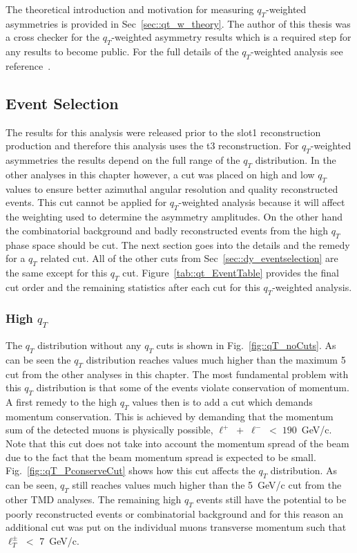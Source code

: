 The theoretical introduction and motivation for measuring $q_T$-weighted
asymmetries is provided in Sec~\ref{sec::qt_w_theory}.  The author of this
thesis was a cross checker for the $q_T$-weighted asymmetry results which is a
required step for any results to become public.  For the full details of the
$q_T$-weighted analysis see reference~\cite{janthesis}.

\subsection{Event Selection}
The results for this analysis were released prior to the slot1 reconstruction
production and therefore this analysis uses the t3 reconstruction.  For
$q_T$-weighted asymmetries the results depend on the full range of the $q_T$
distribution.  In the other analyses in this chapter however, a cut was placed
on high and low $q_T$ values to ensure better azimuthal angular resolution and
quality reconstructed events.  This cut cannot be applied for $q_T$-weighted
analysis because it will affect the weighting used to determine the asymmetry
amplitudes.  On the other hand the combinatorial background and badly
reconstructed events from the high $q_T$ phase space should be cut.  The next
section goes into the details and the remedy for a $q_T$ related cut. All of the
other cuts from Sec~\ref{sec::dy_eventselection} are the same except for this
$q_T$ cut. Figure~\ref{tab::qt_EventTable} provides the final cut order and the
remaining statistics after each cut for this $q_T$-weighted analysis.

\subsubsection{High $q_T$} \label{sec::high_qt}
The $q_T$ distribution without any $q_T$ cuts is shown in
Fig.~\ref{fig::qT_noCuts}.  As can be seen the $q_T$ distribution reaches values
much higher than the maximum 5~{\gvc} cut from the other analyses in this
chapter.  The most fundamental problem with this $q_T$ distribution is that some
of the events violate conservation of momentum.  A first remedy to the high
$q_T$ values then is to add a cut which demands momentum conservation.  This is
achieved by demanding that the momentum sum of the detected muons is physically
possible, $\ell^+ \; + \; \ell^- \; < \; 190$~GeV/c.  Note that this cut does
not take into account the momentum spread of the beam due to the fact that the
beam momentum spread is expected to be small.  Fig.~\ref{fig::qT_PconserveCut}
shows how this cut affects the $q_T$ distribution.  As can be seen, $q_T$ still
reaches values much higher than the 5~GeV/c cut from the other TMD analyses.
The remaining high $q_T$ events still have the potential to be poorly
reconstructed events or combinatorial background and for this reason an
additional cut was put on the individual muons transverse momentum such that
$\ell_T^{\pm} \; <$ 7~GeV/c.

